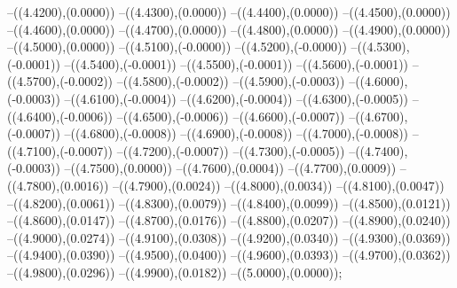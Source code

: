 {	--({\sx*(4.4200)},{\sy*(0.0000)})
	--({\sx*(4.4300)},{\sy*(0.0000)})
	--({\sx*(4.4400)},{\sy*(0.0000)})
	--({\sx*(4.4500)},{\sy*(0.0000)})
	--({\sx*(4.4600)},{\sy*(0.0000)})
	--({\sx*(4.4700)},{\sy*(0.0000)})
	--({\sx*(4.4800)},{\sy*(0.0000)})
	--({\sx*(4.4900)},{\sy*(0.0000)})
	--({\sx*(4.5000)},{\sy*(0.0000)})
	--({\sx*(4.5100)},{\sy*(-0.0000)})
	--({\sx*(4.5200)},{\sy*(-0.0000)})
	--({\sx*(4.5300)},{\sy*(-0.0001)})
	--({\sx*(4.5400)},{\sy*(-0.0001)})
	--({\sx*(4.5500)},{\sy*(-0.0001)})
	--({\sx*(4.5600)},{\sy*(-0.0001)})
	--({\sx*(4.5700)},{\sy*(-0.0002)})
	--({\sx*(4.5800)},{\sy*(-0.0002)})
	--({\sx*(4.5900)},{\sy*(-0.0003)})
	--({\sx*(4.6000)},{\sy*(-0.0003)})
	--({\sx*(4.6100)},{\sy*(-0.0004)})
	--({\sx*(4.6200)},{\sy*(-0.0004)})
	--({\sx*(4.6300)},{\sy*(-0.0005)})
	--({\sx*(4.6400)},{\sy*(-0.0006)})
	--({\sx*(4.6500)},{\sy*(-0.0006)})
	--({\sx*(4.6600)},{\sy*(-0.0007)})
	--({\sx*(4.6700)},{\sy*(-0.0007)})
	--({\sx*(4.6800)},{\sy*(-0.0008)})
	--({\sx*(4.6900)},{\sy*(-0.0008)})
	--({\sx*(4.7000)},{\sy*(-0.0008)})
	--({\sx*(4.7100)},{\sy*(-0.0007)})
	--({\sx*(4.7200)},{\sy*(-0.0007)})
	--({\sx*(4.7300)},{\sy*(-0.0005)})
	--({\sx*(4.7400)},{\sy*(-0.0003)})
	--({\sx*(4.7500)},{\sy*(0.0000)})
	--({\sx*(4.7600)},{\sy*(0.0004)})
	--({\sx*(4.7700)},{\sy*(0.0009)})
	--({\sx*(4.7800)},{\sy*(0.0016)})
	--({\sx*(4.7900)},{\sy*(0.0024)})
	--({\sx*(4.8000)},{\sy*(0.0034)})
	--({\sx*(4.8100)},{\sy*(0.0047)})
	--({\sx*(4.8200)},{\sy*(0.0061)})
	--({\sx*(4.8300)},{\sy*(0.0079)})
	--({\sx*(4.8400)},{\sy*(0.0099)})
	--({\sx*(4.8500)},{\sy*(0.0121)})
	--({\sx*(4.8600)},{\sy*(0.0147)})
	--({\sx*(4.8700)},{\sy*(0.0176)})
	--({\sx*(4.8800)},{\sy*(0.0207)})
	--({\sx*(4.8900)},{\sy*(0.0240)})
	--({\sx*(4.9000)},{\sy*(0.0274)})
	--({\sx*(4.9100)},{\sy*(0.0308)})
	--({\sx*(4.9200)},{\sy*(0.0340)})
	--({\sx*(4.9300)},{\sy*(0.0369)})
	--({\sx*(4.9400)},{\sy*(0.0390)})
	--({\sx*(4.9500)},{\sy*(0.0400)})
	--({\sx*(4.9600)},{\sy*(0.0393)})
	--({\sx*(4.9700)},{\sy*(0.0362)})
	--({\sx*(4.9800)},{\sy*(0.0296)})
	--({\sx*(4.9900)},{\sy*(0.0182)})
	--({\sx*(5.0000)},{\sy*(0.0000)});
}
